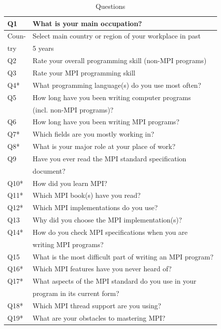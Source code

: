 \documentclass[conference,10pt,letterpaper]{IEEEtran}
\begin{document}
\begin{table}
\begin{center}%
  \caption{Questions}\label{tab:questions}
\begin{tabular}{l|l}%
  \hline
  Q1  & What is your main occupation? \\
  \hline
  Coun- & Select main country or region of your workplace in past \\
  try & 5 years \\
  \hline
  Q2   & Rate your overall programming skill (non-MPI programs) \\
  \hline
  Q3   & Rate your MPI programming skill \\
  \hline
  Q4*  & What programming language(s) do you use most often? \\
  \hline
  Q5   & How long have you been writing computer programs \\
  & (incl. non-MPI programs)? \\
  \hline
  Q6   & How long have you been writing MPI programs? \\
  \hline
  Q7*  & Which fields are you mostly working in? \\
  \hline
  Q8*  & What is your major role at your place of work? \\
  \hline
  Q9   & Have you ever read the MPI standard specification \\
  & document? \\
  \hline
  Q10* & How did you learn MPI? \\
  \hline
  Q11* & Which MPI book(s) have you read? \\
  \hline
  Q12* & Which MPI implementations do you use? \\
  \hline
  Q13  & Why did you choose the MPI implementation(s)? \\
  \hline
  Q14* & How do you check MPI specifications when you are \\
  & writing MPI programs? \\
  \hline
  Q15  & What is the most difficult part of writing an MPI program? \\
  \hline
  Q16* & Which MPI features have you never heard of? \\
  \hline
  Q17* & What aspects of the MPI standard do you use in your \\
  & program in its current form? \\
  \hline
  Q18* & Which MPI thread support are you using? \\
  \hline
  Q19* & What are your obstacles to mastering MPI? \\

\end{tabular}
\end{center}
\end{table}
\end{document}
